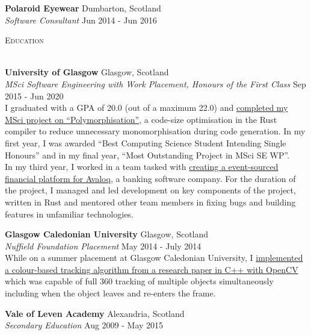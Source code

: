 \documentclass[a4paper]{article}
\newcommand{\lineunder} {
  \vspace*{-8pt} \\
  \hspace*{-18pt} \hrulefill \\
}
\newcommand{\header} [1] {
  {\hspace*{-18pt}\vspace*{6pt} \textsc{#1}}
  \vspace*{-6pt} \lineunder
}
\begin{document}
\textbf{Polaroid Eyewear} \hfill {\color{gray} Dumbarton, Scotland} \\
\textit{Software Consultant} \hfill {\color{gray} Jun 2014 - Jun 2016} \\
\vspace{2mm}

\header{Education}
\vspace{1mm}

\textbf{University of Glasgow} \hfill {\color{gray} Glasgow, Scotland} \\
\textit{MSci Software Engineering with Work Placement, Honours of the First Class} \hfill {\color{gray} Sep 2015 - Jun 2020} \\
\vspace{2mm}
I graduated with a GPA of 20.0 (out of a maximum 22.0) and
\href{https://davidtw.co/media/masters_dissertation.pdf}{completed my MSci project on 
``Polymorphisation''}, a code-size optimisation in the Rust compiler to reduce unnecessary
monomorphisation during code generation. In my first year, I was awarded ``Best Computing Science
Student Intending Single Honours'' and in my final year, ``Most Outstanding Project in MSci SE
WP''. \\
\vspace{2mm}
In my third year, I worked in a team tasked with
\href{https://davidtw.co/media/autokrator_dissertation.pdf}{creating a event-sourced financial
platform for Avaloq}, a banking software company. For the duration of the project, I managed and
led development on key components of the project, written in Rust and mentored other team members
in fixing bugs and building features in unfamiliar technologies.
\vspace{2mm}

\textbf{Glasgow Caledonian University} \hfill {\color{gray} Glasgow, Scotland} \\
\textit{Nuffield Foundation Placement} \hfill {\color{gray} May 2014 - July 2014} \\
\vspace{2mm}
While on a summer placement at Glasgow Caledonian University, I
\href{https://davidtw.co/media/camshift_report.pdf}{implemented a colour-based tracking algorithm
from a research paper in C++ with OpenCV} which was capable of full 360 tracking of multiple
objects simultaneously including when the object leaves and re-enters the frame.
\vspace{2mm}

\textbf{Vale of Leven Academy} \hfill {\color{gray} Alexandria, Scotland} \\
\textit{Secondary Education} \hfill {\color{gray} Aug 2009 - May 2015} \\
\vspace{2mm}
\end{document}
